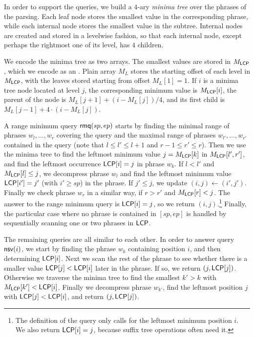 In order to support the queries, we build a $4$-ary \emph{minima tree} over
the phrases of the \RLZ{} parsing. Each leaf node stores the smallest \LCP{}
value in the corresponding phrase, while each internal node stores the
smallest value in the subtree. Internal nodes are created and stored in a
levelwise fashion, so that each internal node, except perhaps the rightmost
one of its level, has $4$ children.

We encode the minima tree as two arrays. The smallest \LCP{} values are
stored in $M_{\mathsf{LCP}}$, which we encode as an \slarray. Plain array $M_{L}$
stores the starting offset of each level in $M_{\mathsf{LCP}}$, with the leaves
stored starting from offset $M_{L}[1] = 1$. If $i$ is a minima tree node
located at level $j$, the corresponding minimum value is $M_{\mathsf{LCP}}[i]$, the
parent of the node is $M_{L}[j+1] + (i - M_{L}[j]) / 4$, and its first child
is $M_{L}[j-1] + 4 \cdot (i - M_{L}[j])$.

A range minimum query $\mathsf{rmq}(sp,ep)$ starts by finding the minimal range of
phrases $w_{l}, \dotsc, w_{r}$ covering the query and the maximal range of
phrases $w_{l'}, \dotsc, w_{r'}$ contained in the query (note that $l \le l' \le
l+1$ and $r-1 \le r' \le r$). Then we use the
minima tree to find the leftmost minimum value $j = M_{\mathsf{LCP}}[k]$ in
$M_{\mathsf{LCP}}[l',r']$, and find the leftmost occurrence $\mathsf{LCP}[i] = j$ in phrase
$w_{k}$. If $l < l'$ and $M_{\mathsf{LCP}}[l] \le j$, we decompress phrase $w_{l}$
and find the leftmost minimum value $\mathsf{LCP}[i'] = j'$ (with $i' \ge sp$) in the
phrase. If $j' \le j$, we update $(i,j) \leftarrow (i',j')$. Finally we check
phrase $w_{r}$ in a similar way, if $r > r'$ and $M_{\mathsf{LCP}}[r] < j$. The answer
to the range minimum query is $\mathsf{LCP}[i] = j$, so we return
$(i,j)$.\footnote{The definition of the query only calls for the leftmost
minimum position $i$. We also return $\mathsf{LCP}[i] = j$, because suffix tree
operations often need it.} Finally, the particular case where no phrase is
contained in $[sp,ep]$ is handled by sequentially scanning one or two phrases
in $\textsf{LCP}$.

The remaining queries are all similar to each other. In order to answer query
$\mathsf{nsv}(i)$, we start by finding the phrase $w_{k}$ containing position $i$,
and then determining $\mathsf{LCP}[i]$. Next we scan the rest of the phrase to see
whether there is a smaller value $\mathsf{LCP}[j] < \mathsf{LCP}[i]$ later in the phrase. If
so, we return $(j,\mathsf{LCP}[j])$. Otherwise we traverse the minima tree to find
the smallest $k' > k$ with $M_{\mathsf{LCP}}[k'] < \mathsf{LCP}[i]$. Finally we decompress
phrase $w_{k'}$, find the leftmost position $j$ with $\mathsf{LCP}[j] < \mathsf{LCP}[i]$,
and return $(j,\mathsf{LCP}[j])$.

